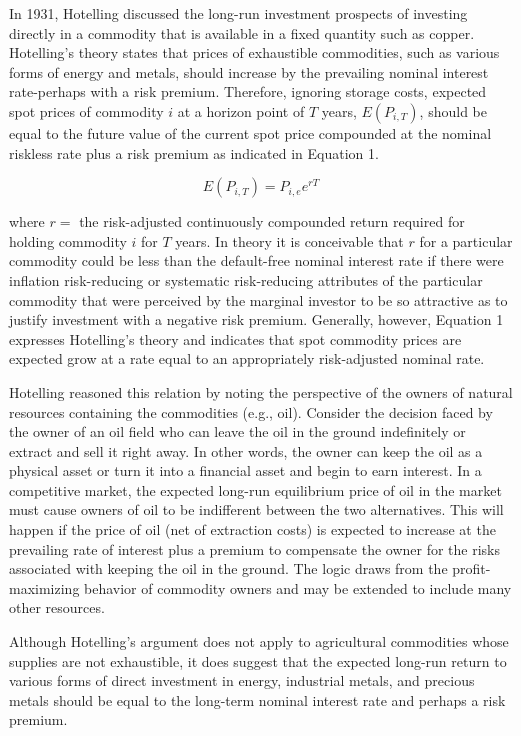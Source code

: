 \documentclass[11pt]{article}
\begin{document}
In 1931, Hotelling discussed the long-run investment prospects of investing directly in a commodity that is available in a fixed quantity such as copper. Hotelling's theory states that prices of exhaustible commodities, such as various forms of energy and metals, should increase by the prevailing nominal interest rate-perhaps with a risk premium. Therefore, ignoring storage costs, expected spot prices of commodity $i$ at a horizon point of $T$ years, $E\left(P_{i, T}\right)$, should be equal to the future value of the current spot price compounded at the nominal riskless rate plus a risk premium as indicated in Equation 1.


\begin{equation*}
E\left(P_{i, T}\right)=P_{i, e} e^{r T} \tag{1}
\end{equation*}


where $r=$ the risk-adjusted continuously compounded return required for holding commodity $i$ for $T$ years. In theory it is conceivable that $r$ for a particular commodity could be less than the default-free nominal interest rate if there were inflation risk-reducing or systematic risk-reducing attributes of the particular commodity that were perceived by the marginal investor to be so attractive as to justify investment with a negative risk premium. Generally, however, Equation 1 expresses Hotelling's theory and indicates that spot commodity prices are expected grow at a rate equal to an appropriately risk-adjusted nominal rate.

Hotelling reasoned this relation by noting the perspective of the owners of natural resources containing the commodities (e.g., oil). Consider the decision faced by the owner of an oil field who can leave the oil in the ground indefinitely or extract and sell it right away. In other words, the owner can keep the oil as a physical asset or turn it into a financial asset and begin to earn interest. In a competitive market, the expected long-run equilibrium price of oil in the market must cause owners of oil to be indifferent between the two alternatives. This will happen if the price of oil (net of extraction costs) is expected to increase at the prevailing rate of interest plus a premium to compensate the owner for the risks associated with keeping the oil in the ground. The logic draws from the profit-maximizing behavior of commodity owners and may be extended to include many other resources.

Although Hotelling's argument does not apply to agricultural commodities whose supplies are not exhaustible, it does suggest that the expected long-run return to various forms of direct investment in energy, industrial metals, and precious metals should be equal to the long-term nominal interest rate and perhaps a risk premium.
\end{document}
